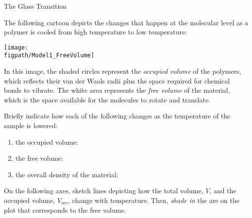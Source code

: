 \begin{activity}{The Glass Transition}
\begin{instructornotes}
\end{instructornotes}


\begin{model}
	\label{\labelbase:mdl:freevolume}
	
	The following cartoon depicts the changes that happen at the molecular level as a polymer is cooled from high temperature to low temperature:
	
	\centerline{\texttt{[image: \\figpath/Model1\_FreeVolume]}}
	
	In this image, the shaded circles represent the \textit{occupied volume} of the polymers, which reflects their van der Waals radii plus the space required for chemical bonds to vibrate.  The white area represents the \emph{free volume} of the material, which is the space available for the molecules to rotate and translate.
	
\end{model}


\begin{ctqs}

	\question Briefly indicate how each of the following changes as the temperature of the sample is lowered:
	
		\begin{enumerate}
		
			\item the occupied volume:
			
				\begin{solution}[0.25in]
				\end{solution}
			
			\item the free volume:
			
				\begin{solution}[0.25in]
				\end{solution}
			
			\item the overall density of the material:
			
				\begin{solution}[0.25in]
				\end{solution}
			
		\end{enumerate}
		
	\question On the following axes, sketch lines depicting how the total volume, $V$, and the occupied volume, $V_{occ}$, change with temperature.  Then, \emph{shade in} the are on the plot that corresponds to the free volume. \label{\labelbase:ctq:VTplot1}
	

\end{ctqs}
\end{activity}
